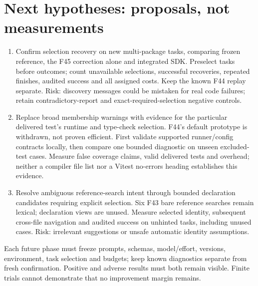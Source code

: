 \documentclass[11pt,a4paper]{article}
\begin{document}
\section{Next hypotheses: proposals, not measurements}
\begin{enumerate}
\item Confirm selection recovery on new multi-package tasks, comparing frozen
reference, the F45 correction alone and integrated SDK. Preselect tasks before
outcomes; count unavailable selections, successful recoveries, repeated finishes,
audited success and all assigned costs. Keep the known F44 replay separate.
Risk: discovery messages could be mistaken for real code failures; retain
contradictory-report and exact-required-selection negative controls.
\item Replace broad membership warnings with evidence for the particular
delivered test's runtime and type-check selection. F44's default prototype is
withdrawn, not proven efficient. First validate supported runner/config contracts
locally, then compare one bounded diagnostic on unseen excluded-test cases.
Measure false coverage claims, valid delivered tests and overhead; neither a
compiler file list nor a Vitest no-errors heading establishes this evidence.
\item Resolve ambiguous reference-search intent through bounded declaration
candidates requiring explicit selection. Six F43 bare reference searches remain
lexical; declaration views are unused. Measure selected identity, subsequent
cross-file navigation and audited success on unhinted tasks, including unused
cases. Risk: irrelevant suggestions or unsafe automatic identity assumptions.
\end{enumerate}
Each future phase must freeze prompts, schemas, model/effort, versions,
environment, task selection and budgets; keep known diagnostics separate from
fresh confirmation. Positive and adverse results must both remain visible.
Finite trials cannot demonstrate that no improvement margin remains.
\end{document}
